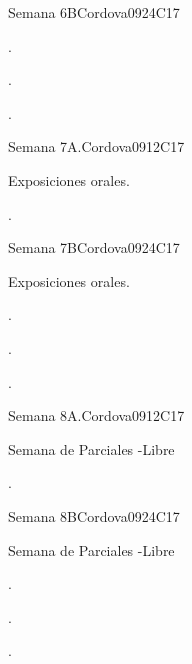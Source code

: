 \begin{syllabus}
\begin{unit}{Semana 6B}{}{Cordova09}{24}{C17}
   \begin{learningoutcomes}
      \item . 
      \item .
      \item . 
      \end{learningoutcomes}
\end{unit}

\begin{unit}{Semana 7A.}{}{Cordova09}{12}{C17}
   \begin{topics}
      \item Exposiciones orales.
   \end{topics}
   \begin{learningoutcomes}
      \item . 
   \end{learningoutcomes}
\end{unit}

\begin{unit}{Semana 7B}{}{Cordova09}{24}{C17}
   \begin{topics}
      \item Exposiciones orales.
   \end{topics}

   \begin{learningoutcomes}
      \item . 
      \item .
      \item . 
      \end{learningoutcomes}
\end{unit}

\begin{unit}{Semana 8A.}{}{Cordova09}{12}{C17}
   \begin{topics}
      \item Semana de Parciales -Libre
   \end{topics}
   \begin{learningoutcomes}
      \item . 
   \end{learningoutcomes}
\end{unit}

\begin{unit}{Semana 8B}{}{Cordova09}{24}{C17}
   \begin{topics}
      \item Semana de Parciales -Libre
   \end{topics}

   \begin{learningoutcomes}
      \item . 
      \item .
      \item . 
      \end{learningoutcomes}
\end{unit}


\end{syllabus}
